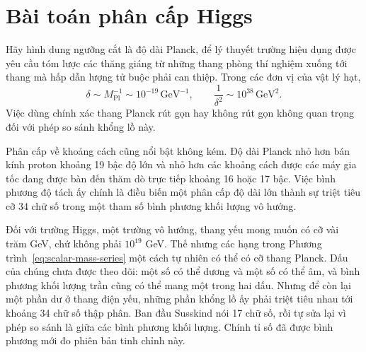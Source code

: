 \section{Bài toán phân cấp Higgs}

Hãy hình dung ngưỡng cắt là độ dài Planck, để lý thuyết trường hiệu dụng được yêu cầu tóm lược các thăng giáng từ những thang phòng thí nghiệm xuống tới thang mà hấp dẫn lượng tử buộc phải can thiệp.
Trong các đơn vị của vật lý hạt,
\begin{equation}
\delta\sim M_{\mathrm{Pl}}^{-1}\sim10^{-19}\,\mathrm{GeV}^{-1},
\qquad
\frac{1}{\delta^2}\sim10^{38}\,\mathrm{GeV}^2.
\label{eq:planck-cutoff}
\end{equation}
Việc dùng chính xác thang Planck rút gọn hay không rút gọn không quan trọng đối với phép so sánh khổng lồ này.

Phân cấp về khoảng cách cũng nổi bật không kém. Độ dài Planck nhỏ hơn bán kính proton khoảng 19 bậc độ lớn và nhỏ hơn các khoảng cách được các máy gia tốc đang được bàn đến thăm dò trực tiếp khoảng 16 hoặc 17 bậc. Việc bình phương độ tách ấy chính là điều biến một phân cấp độ dài lớn thành sự triệt tiêu cỡ 34 chữ số trong một tham số bình phương khối lượng vô hướng.

Đối với trường Higgs, một trường vô hướng, thang yếu mong muốn có cỡ vài trăm GeV, chứ không phải \(10^{19}\) GeV. Thế nhưng các hạng trong Phương trình~\eqref{eq:scalar-mass-series} một cách tự nhiên có thể có cỡ thang Planck. Dấu của chúng chưa được theo dõi: một số có thể dương và một số có thể âm, và bình phương khối lượng trần cũng có thể mang một trong hai dấu. Nhưng để còn lại một phần dư ở thang điện yếu, những phần khổng lồ ấy phải triệt tiêu nhau tới khoảng 34 chữ số thập phân. Ban đầu Susskind nói 17 chữ số, rồi tự sửa lại vì phép so sánh là giữa các bình phương khối lượng. Chính tỉ số đã được bình phương mới đo phiên bản tinh chỉnh này.

\begin{classroomqa}
\end{classroomqa}

